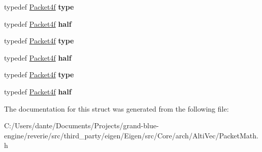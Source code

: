 \begin{DoxyCompactItemize}
typedef \mbox{\hyperlink{struct_eigen_1_1internal_1_1_packet4f}{Packet4f}} {\bfseries type}
\item 
\mbox{\label{struct_eigen_1_1internal_1_1packet__traits_3_01float_01_4_ae218bb63db50937a710084a1ed9747c0}} 
typedef \mbox{\hyperlink{struct_eigen_1_1internal_1_1_packet4f}{Packet4f}} {\bfseries half}
\item 
\mbox{\label{struct_eigen_1_1internal_1_1packet__traits_3_01float_01_4_a753e39039ed22b2dde1684c1f8c62985}} 
typedef \mbox{\hyperlink{struct_eigen_1_1internal_1_1_packet4f}{Packet4f}} {\bfseries type}
\item 
\mbox{\label{struct_eigen_1_1internal_1_1packet__traits_3_01float_01_4_ae218bb63db50937a710084a1ed9747c0}} 
typedef \mbox{\hyperlink{struct_eigen_1_1internal_1_1_packet4f}{Packet4f}} {\bfseries half}
\item 
\mbox{\label{struct_eigen_1_1internal_1_1packet__traits_3_01float_01_4_a753e39039ed22b2dde1684c1f8c62985}} 
typedef \mbox{\hyperlink{struct_eigen_1_1internal_1_1_packet4f}{Packet4f}} {\bfseries type}
\item 
\mbox{\label{struct_eigen_1_1internal_1_1packet__traits_3_01float_01_4_ae218bb63db50937a710084a1ed9747c0}} 
typedef \mbox{\hyperlink{struct_eigen_1_1internal_1_1_packet4f}{Packet4f}} {\bfseries half}
\end{DoxyCompactItemize}


The documentation for this struct was generated from the following file\+:\begin{DoxyCompactItemize}
\item 
C\+:/\+Users/dante/\+Documents/\+Projects/grand-\/blue-\/engine/reverie/src/third\+\_\+party/eigen/\+Eigen/src/\+Core/arch/\+Alti\+Vec/Packet\+Math.\+h\end{DoxyCompactItemize}
